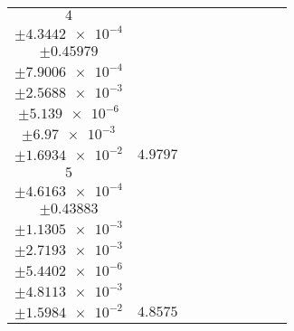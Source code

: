 \documentclass[8pt]{article}
\begin{document}
\begin{longtable}[l]{c c c c c c c c c}
$\num{4}$ & \begin{tabular}[c]{@{}c@{}}$\num{6.0592e-2}$ \\ $\pm\num{4.3442e-4}$\end{tabular} & \begin{tabular}[c]{@{}c@{}}$\num{0.13519}$ \\ $\pm\num{0.45979}$\end{tabular} & \begin{tabular}[c]{@{}c@{}}$\num{2.1405}$ \\ $\pm\num{7.9006e-4}$\end{tabular} & \begin{tabular}[c]{@{}c@{}}$\num{946.83}$ \\ $\pm\num{2.5688e-3}$\end{tabular} & \begin{tabular}[c]{@{}c@{}}$\num{1.8942}$ \\ $\pm\num{5.139e-6}$\end{tabular} & \begin{tabular}[c]{@{}c@{}}$\num{1.1614}$ \\ $\pm\num{6.97e-3}$\end{tabular} & \begin{tabular}[c]{@{}c@{}}$\num{4.2332}$ \\ $\pm\num{1.6934e-2}$\end{tabular} & $\num{4.9797}$\\
$\num{5}$ & \begin{tabular}[c]{@{}c@{}}$\num{5.9868e-2}$ \\ $\pm\num{4.6163e-4}$\end{tabular} & \begin{tabular}[c]{@{}c@{}}$\num{0.11816}$ \\ $\pm\num{0.43883}$\end{tabular} & \begin{tabular}[c]{@{}c@{}}$\num{2.4393}$ \\ $\pm\num{1.1305e-3}$\end{tabular} & \begin{tabular}[c]{@{}c@{}}$\num{947.1}$ \\ $\pm\num{2.7193e-3}$\end{tabular} & \begin{tabular}[c]{@{}c@{}}$\num{1.8947}$ \\ $\pm\num{5.4402e-6}$\end{tabular} & \begin{tabular}[c]{@{}c@{}}$\num{1.1638}$ \\ $\pm\num{4.8113e-3}$\end{tabular} & \begin{tabular}[c]{@{}c@{}}$\num{4.0425}$ \\ $\pm\num{1.5984e-2}$\end{tabular} & $\num{4.8575}$\\

\end{longtable}
\end{document}

